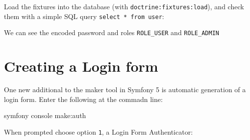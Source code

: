 \documentclass[a4paperpaper,openright]{book}
\newenvironment{Shaded}{}{}
\newcommand{\ExtensionTok}[1]{#1}
\newcommand{\NormalTok}[1]{#1}
\newcommand{\OperatorTok}[1]{\textcolor[rgb]{0.40,0.40,0.40}{#1}}
\newcommand{\StringTok}[1]{\textcolor[rgb]{0.25,0.44,0.63}{#1}}
\begin{document}
Load the fixtures into the database (with
\texttt{doctrine:fixtures:load}), and check them with a simple SQL query
\texttt{select\ *\ from\ user}:

\begin{Shaded}
\end{Shaded}

We can see the encoded password and roles \texttt{ROLE\_USER} and
\texttt{ROLE\_ADMIN}

\hypertarget{creating-a-login-form}{%
\section{Creating a Login form}\label{creating-a-login-form}}

One new additional to the maker tool in Symfony 5 is automatic
generation of a login form. Enter the following at the commadn line:

\begin{Shaded}
\begin{Highlighting}[]
    \ExtensionTok{symfony}\NormalTok{ console make:auth}
\end{Highlighting}
\end{Shaded}

When prompted choose option \texttt{1}, a Login Form Authenticator:
\end{document}
